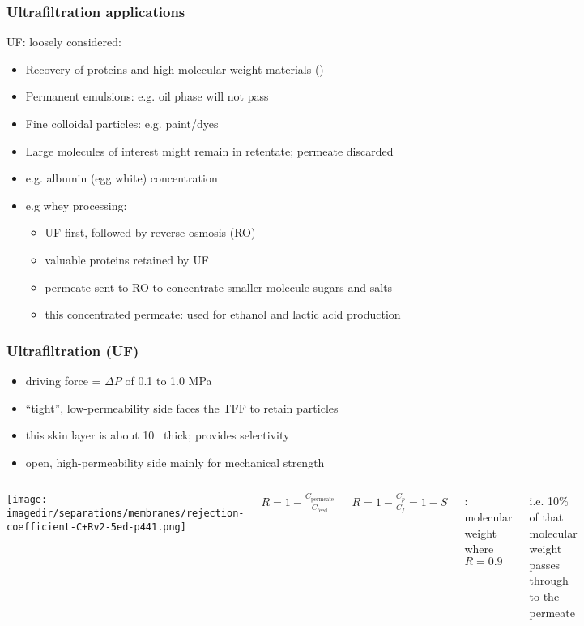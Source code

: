 \begin{frame}\frametitle{Ultrafiltration applications} 
	UF: loosely considered: {\color{myGreen}{``cross-flow filtration at molecular level''}}
	\begin{itemize}
		\item	Recovery of proteins and high molecular weight materials ({\color{purple}{solute}})
		\item	Permanent emulsions: e.g. oil phase will not pass
		\item	Fine colloidal particles: e.g. paint/dyes 
		\item	Large molecules of interest might remain in retentate; permeate discarded
		\item	e.g. albumin (egg white) concentration
		\item	e.g whey processing: %
		\begin{itemize}
			\item	UF first, followed by reverse osmosis (RO)
			\item	valuable proteins retained by UF
			\item	permeate sent to RO to concentrate smaller molecule sugars and salts
			\item	this concentrated permeate: used for ethanol and lactic acid production
		\end{itemize}
	\end{itemize}
\end{frame}

\begin{frame}\frametitle{Ultrafiltration (UF)}
	
	\begin{itemize}		
		\item	driving force = $\Delta P$ of 0.1 to 1.0 MPa %
		\item	``tight'', low-permeability side faces the TFF to retain particles
		\item	this skin layer is about 10\micron~ thick; provides selectivity 
		\item	open, high-permeability side mainly for mechanical strength %
	\end{itemize}
	
	\begin{columns}[t]
			\begin{center}
				\texttt{[image: \\imagedir/separations/membranes/rejection-coefficient-C+Rv2-5ed-p441.png]}
			\end{center}
		
			$R = 1 -\displaystyle \frac{C_\text{permeate}}{C_\text{feed}}$
			
			$R = 1- \displaystyle \frac{C_p}{C_f} = 1 -S$
			
			\vspace{12pt}
			{\color{purple}{MWCO}}: molecular weight where $R=0.9$
			
			\vspace{12pt}
			i.e. 10\% of that molecular weight passes through to the permeate
	\end{columns}	
\end{frame}

